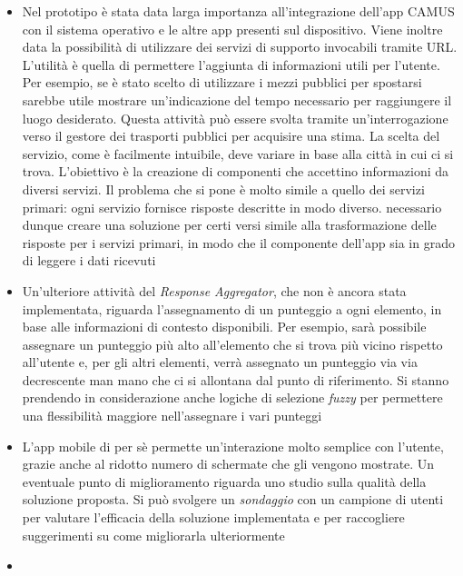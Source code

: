 \begin{itemize}
	\item
	Nel prototipo è stata data larga importanza all'integrazione dell'app CAMUS con il sistema operativo e le altre app presenti sul dispositivo. Viene inoltre data la possibilità di utilizzare dei servizi di supporto invocabili tramite URL. L'utilità è quella di permettere l'aggiunta di informazioni utili per l'utente. Per esempio, se è stato scelto di utilizzare i mezzi pubblici per spostarsi sarebbe utile mostrare un'indicazione del tempo necessario per raggiungere il luogo desiderato. Questa attività può essere svolta tramite un'interrogazione verso il gestore dei trasporti pubblici per acquisire una stima. La scelta del servizio, come è facilmente intuibile, deve variare in base alla città in cui ci si trova. L'obiettivo è la creazione di componenti che accettino informazioni da diversi servizi. Il problema che si pone è molto simile a quello dei servizi primari: ogni servizio fornisce risposte descritte in modo diverso. \upe necessario dunque creare una soluzione per certi versi simile alla trasformazione delle risposte per i servizi primari, in modo che il componente dell'app sia in grado di leggere i dati ricevuti
	\item
	Un’ulteriore attività del \emph{Response Aggregator}, che non è ancora stata implementata, riguarda l’assegnamento di un punteggio a ogni elemento, in base alle informazioni di contesto disponibili. Per esempio, sarà possibile assegnare un punteggio più alto all’elemento che si trova più vicino rispetto all’utente e, per gli altri elementi, verrà assegnato un punteggio via via decrescente man mano che ci si allontana dal punto di riferimento. Si stanno prendendo in considerazione anche logiche di selezione \emph{fuzzy} per permettere una  flessibilità maggiore nell’assegnare i vari punteggi
	\item
	L'app mobile di per sè permette un'interazione molto semplice con l'utente, grazie anche al ridotto numero di schermate che gli vengono mostrate. Un eventuale punto di miglioramento riguarda uno studio sulla qualità della soluzione proposta. Si può svolgere un \emph{sondaggio} con un campione di utenti per valutare l'efficacia della soluzione implementata e per raccogliere suggerimenti su come migliorarla ulteriormente
	\item

\end{itemize}
